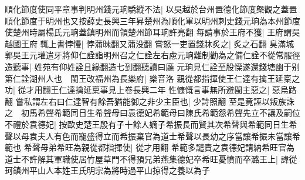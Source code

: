 順化節度使同平章事判明州錢元珦驕縱不法|{
	以吳越於台州置德化節度槩觀之蓋置順化節度于明州也又按薛史長興三年昇楚州為順化軍以明州刺史錢元珦為本州節度使楚州時屬楊氏元珦蓋鎮明州而領楚州節耳珦許亮翻}
每請事於王府不獲|{
	王府謂吳越國王府}
輒上書悖慢|{
	悖蒲昧翻又蒲没翻}
嘗怒一吏置錢牀炙之|{
	炙之石翻}
臭滿城郭吳王元瓘遣牙將仰仁詮詣明州召之仁詮左右慮元珦難制勸為之備仁詮不從常服徑造聽事|{
	姓苑有仰姓詮且緣翻造七到翻聽讀曰廳}
元珦見仁詮至股慄遂還錢塘幽于别第仁詮湖州人也　閩王改福州為長樂府|{
	樂音洛}
親從都指揮使王仁達有擒王延稟之功|{
	從才用翻王仁達擒延稟事見上卷長興二年}
性慷慨言事無所避閩主惡之|{
	惡烏路翻}
嘗私謂左右曰仁達智有餘吾猶能御之非少主臣也|{
	少詩照翻}
至是竟誣以叛族誅之　初馬希聲希範同日生希聲母曰袁德妃希範母曰陳氏希範怨希聲先立不讓及嗣位不禮於袁德妃|{
	按歐史楚王殷有子十餘人嫡子希振長而賢其次希聲與希範同日生希聲以母袁夫人有色而寵盛得立而希振棄官為道士希聲以長幼之序當讓希振未當讓希範也}
希聲母弟希旺為親從都指揮使|{
	從才用翻}
希範多譴責之袁德妃請納希旺官為道士不許解其軍職使居竹屋草門不得預兄弟燕集德妃卒希旺憂憤而卒潞王上|{
	諱從珂鎮州平山人本姓王氏明宗為將時過平山掠得之養以為子}



